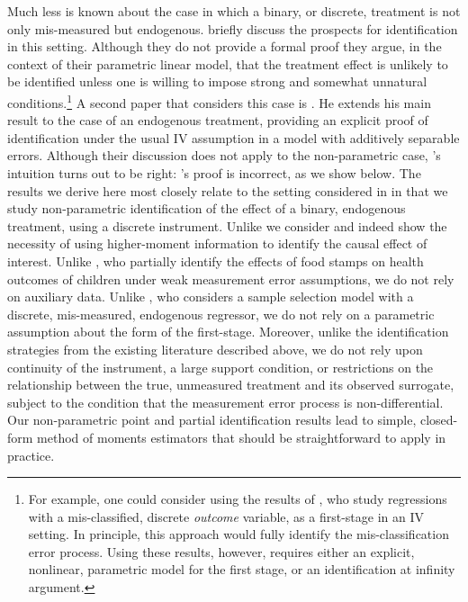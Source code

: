 Much less is known about the case in which a binary, or discrete, treatment is not only mis-measured but endogenous.
\cite{FL} briefly discuss the prospects for identification in this setting.
Although they do not provide a formal proof they argue, in the context of their parametric linear model, that the treatment effect is unlikely to be identified unless one is willing to impose strong and somewhat unnatural conditions.\footnote{For example, one could consider using the results of \cite{Hausman}, who study regressions with a mis-classified, discrete \emph{outcome} variable, as a first-stage in an IV setting. In principle, this approach would fully identify the mis-classification error process. Using these results, however, requires either an explicit, nonlinear, parametric model for the first stage, or an identification at infinity argument.} 
A second paper that considers this case is \cite{Mahajan}.
He extends his main result to the case of an endogenous treatment, providing an explicit proof of identification under the usual IV assumption in a model with additively separable errors.
Although their discussion does not apply to the non-parametric case, \citeauthor{FL}'s intuition turns out to be right: \citeauthor{Mahajan}'s proof is incorrect, as we show below.
The results we derive here most closely relate to the setting considered in \cite{Mahajan} in that we study non-parametric identification of the effect of a binary, endogenous treatment, using a discrete instrument.
Unlike \cite{Mahajan} we consider and indeed show the necessity of using higher-moment information to identify the causal effect of interest.
Unlike \cite{kreider2012}, who partially identify the effects of food stamps on health outcomes of children under weak measurement error assumptions, we do not rely on auxiliary data. 
Unlike \cite{shiu2015}, who considers a sample selection model with a discrete, mis-measured, endogenous regressor, we do not rely on a parametric assumption about the form of the first-stage.
Moreover, unlike the identification strategies from the existing literature described above, we do not rely upon continuity of the instrument, a large support condition, or restrictions on the relationship between the true, unmeasured treatment and its observed surrogate, subject to the condition that the measurement error process is non-differential.
Our non-parametric point and partial identification results lead to simple, closed-form method of moments estimators that should be straightforward to apply in practice.



